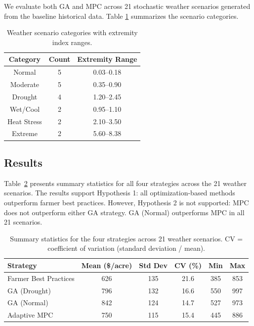 \documentclass[preprint,12pt]{elsarticle}
\begin{document}
We evaluate both GA and MPC across 21 stochastic weather scenarios generated from the baseline historical data. Table \ref{tab:scenario-categories} summarizes the scenario categories.

\begin{table}[ht]
\centering
\begin{tabular}{|c|c|c|}
\hline
Category    & Count & Extremity Range \\
\hline\hline
Normal      & 5     & 0.03--0.18      \\
Moderate    & 5     & 0.35--0.90      \\
Drought     & 4     & 1.20--2.45      \\
Wet/Cool    & 2     & 0.95--1.10      \\
Heat Stress & 2     & 2.10--3.50      \\
Extreme     & 2     & 5.60--8.38      \\
\hline
\end{tabular}
\caption{Weather scenario categories with extremity index ranges.}
\label{tab:scenario-categories}
\end{table}

\subsection{Results}\label{subsec:results}

Table~\ref{tab:main-results} presents summary statistics for all four strategies across the 21 weather scenarios. The results support Hypothesis 1: all optimization-based methods outperform farmer best practices. However, Hypothesis 2 is not supported: MPC does not outperform either GA strategy. GA (Normal) outperforms MPC in all 21 scenarios.

\begin{table}[ht]
\centering
\begin{tabular}{|l|c|c|c|c|c|}
\hline
Strategy & Mean (\$/acre) & Std Dev & CV (\%) & Min & Max \\
\hline\hline
Farmer Best Practices & 626 & 135 & 21.6 & 385 & 853 \\
GA (Drought)          & 796 & 132 & 16.6 & 550 & 997 \\
GA (Normal)           & 842 & 124 & 14.7 & 527 & 973 \\
Adaptive MPC          & 750 & 115 & 15.4 & 445 & 886 \\
\hline
\end{tabular}
\caption{Summary statistics for the four strategies across 21 weather scenarios. CV = coefficient of variation (standard deviation / mean).}
\label{tab:main-results}
\end{table}
\end{document}
